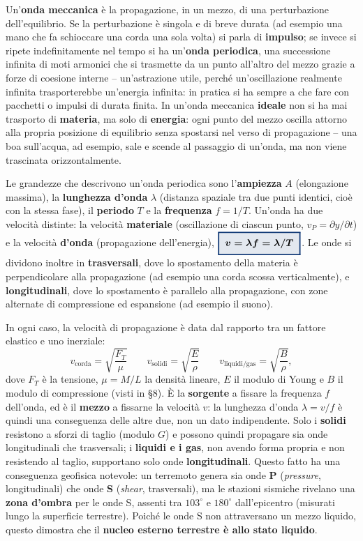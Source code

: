 \documentclass[a4paper,11pt]{article}
\newcommand{\keyeq}[1]{{\setlength{\fboxsep}{6pt}\setlength{\fboxrule}{1.3pt}\fcolorbox{chapblue}{chapblue!12}{\boldmath$\displaystyle #1$}}}
\begin{document}
Un'\textbf{onda meccanica} è la propagazione, in un mezzo, di una perturbazione dell'equilibrio. Se la perturbazione è singola e di breve durata (ad esempio una mano che fa schioccare una corda una sola volta) si parla di \textbf{impulso}; se invece si ripete indefinitamente nel tempo si ha un'\textbf{onda periodica}, una successione infinita di moti armonici che si trasmette da un punto all'altro del mezzo grazie a forze di coesione interne -- un'astrazione utile, perché un'oscillazione realmente infinita trasporterebbe un'energia infinita: in pratica si ha sempre a che fare con pacchetti o impulsi di durata finita. In un'onda meccanica \textbf{ideale} non si ha mai trasporto di \textbf{materia}, ma solo di \textbf{energia}: ogni punto del mezzo oscilla attorno alla propria posizione di equilibrio senza spostarsi nel verso di propagazione -- una boa sull'acqua, ad esempio, sale e scende al passaggio di un'onda, ma non viene trascinata orizzontalmente.

Le grandezze che descrivono un'onda periodica sono l'\textbf{ampiezza} $A$ (elongazione massima), la \textbf{lunghezza d'onda} $\lambda$ (distanza spaziale tra due punti identici, cioè con la stessa fase), il \textbf{periodo} $T$ e la \textbf{frequenza} $f=1/T$. Un'onda ha due velocità distinte: la velocità \textbf{materiale} (oscillazione di ciascun punto, $v_P=\partial y/\partial t$) e la velocità \textbf{d'onda} (propagazione dell'energia), $\keyeq{v=\lambda f=\lambda/T}$. Le onde si dividono inoltre in \textbf{trasversali}, dove lo spostamento della materia è perpendicolare alla propagazione (ad esempio una corda scossa verticalmente), e \textbf{longitudinali}, dove lo spostamento è parallelo alla propagazione, con zone alternate di compressione ed espansione (ad esempio il suono).

In ogni caso, la velocità di propagazione è data dal rapporto tra un fattore elastico e uno inerziale:
\[
v_{\text{corda}} = \sqrt{\frac{F_T}{\mu}} \qquad v_{\text{solidi}} = \sqrt{\frac{E}{\rho}} \qquad v_{\text{liquidi/gas}} = \sqrt{\frac{B}{\rho}},
\]
dove $F_T$ è la tensione, $\mu=M/L$ la densità lineare, $E$ il modulo di Young e $B$ il modulo di compressione (visti in \S8). È la \textbf{sorgente} a fissare la frequenza $f$ dell'onda, ed è il \textbf{mezzo} a fissarne la velocità $v$: la lunghezza d'onda $\lambda=v/f$ è quindi una conseguenza delle altre due, non un dato indipendente. Solo i \textbf{solidi} resistono a sforzi di taglio (modulo $G$) e possono quindi propagare sia onde longitudinali che trasversali; i \textbf{liquidi e i gas}, non avendo forma propria e non resistendo al taglio, supportano solo onde \textbf{longitudinali}. Questo fatto ha una conseguenza geofisica notevole: un terremoto genera sia onde \textbf{P} (\emph{pressure}, longitudinali) che onde \textbf{S} (\emph{shear}, trasversali), ma le stazioni sismiche rivelano una \textbf{zona d'ombra} per le onde S, assenti tra $103^{\circ}$ e $180^{\circ}$ dall'epicentro (misurati lungo la superficie terrestre). Poiché le onde S non attraversano un mezzo liquido, questo dimostra che il \textbf{nucleo esterno terrestre è allo stato liquido}.
\end{document}
